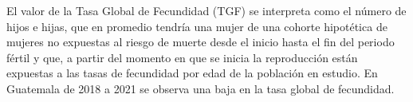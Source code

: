 El valor de la Tasa Global de Fecundidad (TGF) se interpreta como el número de hijos e hijas, que en promedio tendría una mujer de una cohorte hipotética de mujeres no expuestas al riesgo de muerte desde el inicio hasta el fin del periodo fértil y que, a partir del momento en que se inicia la reproducción están expuestas a las tasas de fecundidad por edad de la población en estudio. En Guatemala de 2018 a 2021 se observa una baja en la tasa global de fecundidad.